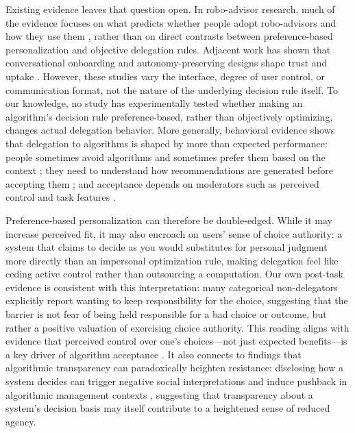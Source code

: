 \documentclass[a4paper, 12pt, fleqn]{article}
\theoremstyle{definition}
\begin{document}
Existing evidence leaves that question open. In robo-advisor research, much of the evidence focuses on what predicts whether people adopt robo-advisors and how they use them \citep[for example,][]{Mahmud2025}, rather than on direct contrasts between preference-based personalization and objective delegation rules. Adjacent work has shown that conversational onboarding and autonomy-preserving designs shape trust and uptake \citep{Hildebrand2021,Fink2024}. However, these studies vary the interface, degree of user control, or communication format, not the nature of the underlying decision rule itself. To our knowledge, no study has experimentally tested whether making an algorithm's decision rule preference-based, rather than objectively optimizing, changes actual delegation behavior. More generally, behavioral evidence shows that delegation to algorithms is shaped by more than expected performance: people sometimes avoid algorithms and sometimes prefer them based on the context \citep{Dietvorst2018,Logg2019}; they need to understand how recommendations are generated before accepting them \citep{Yeomans2019}; and acceptance depends on moderators such as perceived control and task features \citep{Mahmud2022,Chugunova2022}.

Preference-based personalization can therefore be double-edged. While it may increase perceived fit, it may also encroach on users' sense of choice authority: a system that claims to decide as you would substitutes for personal judgment more directly than an impersonal optimization rule, making delegation feel like ceding active control rather than outsourcing a computation. Our own post-task evidence is consistent with this interpretation: many categorical non-delegators explicitly report wanting to keep responsibility for the choice, suggesting that the barrier is not fear of being held responsible for a bad choice or outcome, but rather a positive valuation of exercising choice authority. This reading aligns with evidence that perceived control over one's choices---not just expected benefits---is a key driver of algorithm acceptance \citep{Schaap2024}. It also connects to findings that algorithmic transparency can paradoxically heighten resistance: disclosing how a system decides can trigger negative social interpretations \citep{Chen2024} and induce pushback in algorithmic management contexts \citep{Hu2024}, suggesting that transparency about a system's decision basis may itself contribute to a heightened sense of reduced agency.
\end{document}
